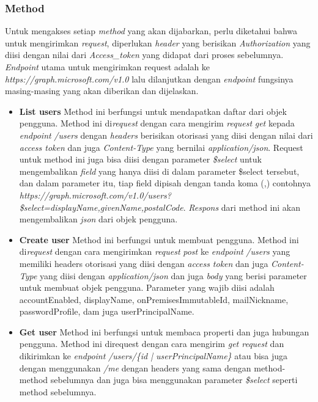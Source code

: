 \subsubsection{Method}
Untuk mengakses setiap \textit{method} yang akan dijabarkan, perlu diketahui bahwa untuk mengirimkan \textit{request}, diperlukan \textit{header} yang berisikan \textit{Authorization} yang diisi dengan nilai dari \textit{Access\_token} yang didapat dari proses sebelumnya. \textit{Endpoint} utama untuk mengirimkan request adalah ke \textit{https://graph.microsoft.com/v1.0} lalu dilanjutkan dengan \textit{endpoint} fungsinya masing-masing yang akan diberikan dan dijelaskan. 

\begin{itemize}
	\item \textbf{List users}
	Method ini berfungsi untuk mendapatkan daftar dari objek pengguna. Method ini di\textit{request} dengan cara mengirim \textit{request} \textit{get} kepada \textit{endpoint} \textit{/users} dengan \textit{headers} berisikan otorisasi yang diisi dengan nilai dari \textit{access token} dan juga \textit{Content-Type} yang bernilai \textit{application/json}. Request untuk method ini juga bisa diisi dengan parameter \textit{\$select} untuk mengembalikan \textit{field} yang hanya diisi di dalam parameter \$select tersebut, dan dalam parameter itu, tiap field dipisah dengan tanda koma (,) contohnya \textit{https://graph.microsoft.com/v1.0/users?\$select=displayName,givenName,postalCode}.  \textit{Respons} dari method ini akan mengembalikan \textit{json} dari objek pengguna. 
	\item \textbf{Create user}
	Method ini berfungsi untuk membuat pengguna. Method ini di\textit{request} dengan cara mengirimkan \textit{request} \textit{post} ke \textit{endpoint} \textit{/users} yang memiliki headers otorisasi yang diisi dengan \textit{access token} dan juga \textit{Content-Type} yang diisi dengan \textit{application/json} dan juga \textit{body} yang berisi parameter untuk membuat objek pengguna. Parameter yang wajib diisi adalah accountEnabled, displayName, onPremisesImmutableId, mailNickname, passwordProfile, dam juga userPrincipalName.  
	\item \textbf{Get user}
	Method ini berfungsi untuk membaca properti dan juga hubungan pengguna. Method ini direquest dengan cara mengirim \textit{get request} dan dikirimkan ke \textit{endpoint} \textit{/users/\{id | userPrincipalName\}} atau bisa juga dengan menggunakan \textit{/me} dengan headers yang sama dengan method-method sebelumnya dan juga bisa menggunakan parameter \textit{\$select} seperti method sebelumnya.  

\end{itemize}
